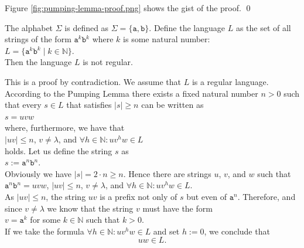 Figure \ref{fig:pumping-lemma-proof.png} shows the gist of the proof.
\qed


\begin{Proposition}
  The alphabet  $\Sigma$ is defined as $\Sigma = \{ \texttt{a}, \texttt{b} \}$.
  Define the language $L$ as the set of all strings of the form $\mathtt{a}^k\mathtt{b}^k$ where $k$
  is some natural number:
  \\[0.2cm]
  \hspace*{1.3cm}
  $L = \bigl\{ \mathtt{a}^k\mathtt{b}^k \mid k \in \mathbb{N} \bigr\}$.
  \\[0.2cm]
  Then the language  $L$ is not regular.
\end{Proposition}

\proofEng
This is a proof by contradiction. We assume that $L$ is a regular language.  According to the
Pumping Lemma there exists a fixed natural number $n>0$ such that every $s \in L$ that satisfies  $|s|
\geq n$ can be written as
\\[0.2cm]
\hspace*{1.3cm}
$s = uvw$
\\[0.2cm]
where, furthermore, we have that
\\[0.2cm]
\hspace*{1.3cm}
$|uv| \leq n$, \quad $v \not= \lambda$, \quad and \quad $\forall h \in \mathbb{N}: uv^h w \in L$
\\[0.2cm]
holds.  Let us define the string $s$ as
\\[0.2cm]
\hspace*{1.3cm}
$s := \mathtt{a}^{n} \mathtt{b}^{n}$.
\\[0.2cm]
Obviously we have $|s| = 2 \cdot n \geq n$.  Hence there are strings $u$, $v$, and $w$
such that 
\\[0.2cm]
\hspace*{1.3cm}
$\mathtt{a}^{n}\mathtt{b}^{n} = uvw$, \quad $|uv| \leq n$, \quad $v \not= \lambda$, 
\quad and \quad $\forall h \in \mathbb{N}: uv^h w \in L$.
\\[0.2cm]
As $|uv| \leq n$, the string $uv$ is a prefix not only of $s$ but even of $\mathtt{a}^n$. Therefore,
and since $v \not= \lambda$ we know that the string $v$ must have the form
\\[0.2cm]
\hspace*{1.3cm}
$v = \mathtt{a}^k$ \quad for some $k \in \mathbb{N}$ such that $k > 0$.
\\[0.2cm]
If we take the formula $\forall h \in \mathbb{N}: uv^h w \in L$ and set  $h:=0$, we conclude that
\begin{equation}
  \label{eq:pumping5}
 uw \in L. 
\end{equation}
